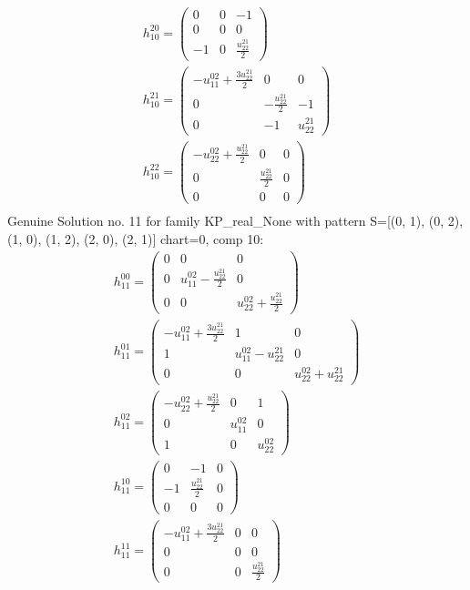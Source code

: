 \documentclass[a4paper, 11pt, twoside, onecolumn]{article}
\begin{document}
\begin{landscape}
\begin{gather*}
	 h_{10}^{20}=\begin{pmatrix}0 & 0 & -1\\0 & 0 & 0\\-1 & 0 & \frac{u^{21}_{22}}{2}\end{pmatrix}\\ 
	 h_{10}^{21}=\begin{pmatrix}- u^{02}_{11} + \frac{3 u^{21}_{22}}{2} & 0 & 0\\0 & - \frac{u^{21}_{22}}{2} & -1\\0 & -1 & u^{21}_{22}\end{pmatrix}\\ 
	 h_{10}^{22}=\begin{pmatrix}- u^{02}_{22} + \frac{u^{21}_{22}}{2} & 0 & 0\\0 & \frac{u^{21}_{22}}{2} & 0\\0 & 0 & 0\end{pmatrix}\\ 
\end{gather*} 
Genuine Solution no. 11 for family KP_real_None with pattern S=[(0, 1), (0, 2), (1, 0), (1, 2), (2, 0), (2, 1)] chart=0, comp 10: 
\begin{gather*} 
	 h_{11}^{00}=\begin{pmatrix}0 & 0 & 0\\0 & u^{02}_{11} - \frac{u^{21}_{22}}{2} & 0\\0 & 0 & u^{02}_{22} + \frac{u^{21}_{22}}{2}\end{pmatrix}\\ 
	 h_{11}^{01}=\begin{pmatrix}- u^{02}_{11} + \frac{3 u^{21}_{22}}{2} & 1 & 0\\1 & u^{02}_{11} - u^{21}_{22} & 0\\0 & 0 & u^{02}_{22} + u^{21}_{22}\end{pmatrix}\\ 
	 h_{11}^{02}=\begin{pmatrix}- u^{02}_{22} + \frac{u^{21}_{22}}{2} & 0 & 1\\0 & u^{02}_{11} & 0\\1 & 0 & u^{02}_{22}\end{pmatrix}\\ 
	 h_{11}^{10}=\begin{pmatrix}0 & -1 & 0\\-1 & \frac{u^{21}_{22}}{2} & 0\\0 & 0 & 0\end{pmatrix}\\ 
	 h_{11}^{11}=\begin{pmatrix}- u^{02}_{11} + \frac{3 u^{21}_{22}}{2} & 0 & 0\\0 & 0 & 0\\0 & 0 & \frac{u^{21}_{22}}{2}\end{pmatrix}\\ 

\end{gather*}
\end{landscape}
\end{document}
